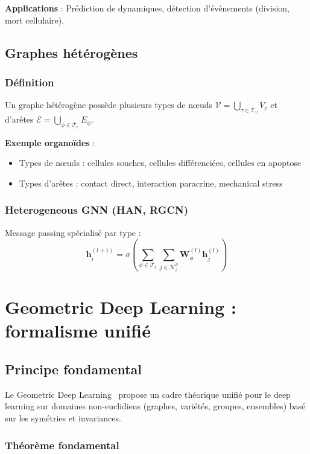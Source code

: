 \textbf{Applications} : Prédiction de dynamiques, détection d'événements (division, mort cellulaire).

\subsection{Graphes hétérogènes}

\subsubsection{Définition}

Un graphe hétérogène possède plusieurs types de nœuds $\mathcal{V} = \bigcup_{\tau \in \mathcal{T}_v} V_\tau$ et d'arêtes $\mathcal{E} = \bigcup_{\phi \in \mathcal{T}_e} E_\phi$.

\textbf{Exemple organoïdes} :
\begin{itemize}
    \item Types de nœuds : cellules souches, cellules différenciées, cellules en apoptose
    \item Types d'arêtes : contact direct, interaction paracrine, mechanical stress
\end{itemize}

\subsubsection{Heterogeneous GNN (HAN, RGCN)}

Message passing spécialisé par type :
\[
\mathbf{h}_i^{(l+1)} = \sigma\left(\sum_{\phi \in \mathcal{T}_e} \sum_{j \in \mathcal{N}_i^\phi} \mathbf{W}_\phi^{(l)} \mathbf{h}_j^{(l)}\right)
\]

\section{Geometric Deep Learning : formalisme unifié}

\subsection{Principe fondamental}

Le Geometric Deep Learning~\cite{Bronstein2021} propose un cadre théorique unifié pour le deep learning sur domaines non-euclidiens (graphes, variétés, groupes, ensembles) basé sur les symétries et invariances.

\subsubsection{Théorème fondamental}

